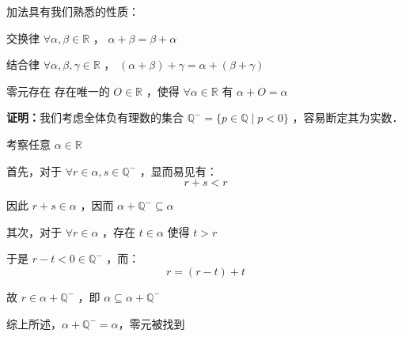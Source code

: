 加法具有我们熟悉的性质：
 \begin{theorem}{交换律}
 $\forall\alpha,\beta\in\mathbb{R}$ ， $\alpha+\beta=\beta+\alpha$ 
 \end{theorem}
\begin{theorem}{结合律}
$\forall \alpha,\beta,\gamma\in\mathbb{R}$ ， $(\alpha+\beta)+\gamma=\alpha+(\beta+\gamma)$
\end{theorem} 
\begin{theorem}{零元存在}
存在唯一的 $O\in\mathbb{R}$ ，使得 $\forall \alpha\in\mathbb{R}$ 有 $\alpha+O=\alpha$

\textbf{证明：}我们考虑全体负有理数的集合 $\mathbb{Q}^-=\{p\in\mathbb{Q}\mid p<0\}$ ，容易断定其为实数．

考察任意 $\alpha\in\mathbb{R}$

首先，对于 $\forall r\in\alpha,s\in\mathbb{Q}^-$ ，显而易见有：
$$r+s< r$$

因此 $r+s\in\alpha$ ，因而 $\alpha+\mathbb{Q}^-\subseteq\alpha$

其次，对于 $\forall r\in\alpha$ ，存在 $t\in\alpha$ 使得 $t>r$

于是 $r-t<0\in\mathbb{Q}^-$ ，而：
$$r=(r-t)+t$$

故 $r\in\alpha+\mathbb{Q}^-$ ，即 $\alpha\subseteq\alpha+\mathbb{Q}^-$

综上所述，$\alpha+\mathbb{Q}^-=\alpha$，零元被找到
\end{theorem}
